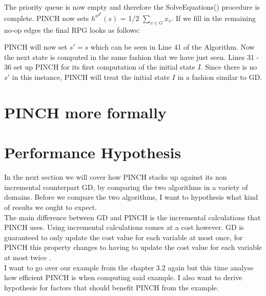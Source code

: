 The priority queue is now empty and therefore the SolveEquations() procedure is complete. PINCH now sets $h^a^d^d(s)$ = 1/2 $\sum_{v \in G}^{} x_v$. If we fill in the remaining no-op edges the final RPG looks as follows:

PINCH will now set $s' = s$ which can be seen in Line 41 of the Algorithm. Now the next state is computed in the same fashion that we have just seen. Lines 31 - 36 set up PINCH for its first computation of the initial state $I$. Since there is no $s'$ in this instance, PINCH will treat the initial state $I$ in a fashion similar to GD.
\section{PINCH more formally}
\newpage
\section{Performance Hypothesis}
In the next section we will cover how PINCH stacks up against its non incremental counterpart GD, by comparing the two algorithms in a variety of domains. Before we compare the two algorithms, I want to hypothesis what kind of results we ought to expect.\\

The main difference between GD and PINCH is the incremental calculations that PINCH uses. Using incremental calculations comes at a cost however. GD is guaranteed to only update the cost value for each variable at most once, for PINCH this property changes to having to update the cost value for each variable at most twice \cite{main}.\\

I want to go over our example from the chapter 3.2 again but this time analyse how efficient PINCH is when computing said example. I also want to derive hypothesis for factors that should benefit PINCH from the example.\\

